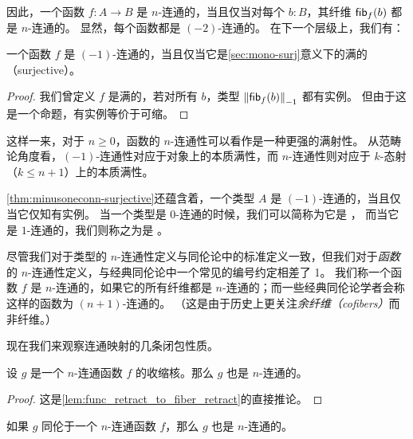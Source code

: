 
因此，一个函数 $f:A\to B$ 是 $n$-连通的，当且仅当对每个 $b:B$，其纤维 $\hfib{f}b$ 都是 $n$-连通的。
显然，每个函数都是 $(-2)$-连通的。
在下一个层级上，我们有：

\begin{lem}\label{thm:minusoneconn-surjective}
  一个函数 $f$ 是 $(-1)$-连通的，当且仅当它是\cref{sec:mono-surj}意义下的满的（surjective）。
\end{lem}

\begin{proof}
  我们曾定义 $f$ 是满的，若对所有 $b$，类型 $\trunc{-1}{\hfiber f b}$ 都有实例。
  但由于这是一个命题，有实例等价于可缩。
\end{proof}

这样一来，对于 $n\ge 0$，函数的 $n$-连通性可以看作是一种更强的满射性。
从范畴论角度看，$(-1)$-连通性对应于对象上的本质满性，而 $n$-连通性则对应于 $k$-态射（$k\le n+1$）上的本质满性。

\cref{thm:minusoneconn-surjective}还蕴含着，一个类型 $A$ 是 $(-1)$-连通的，当且仅当它仅知有实例。
当一个类型是 $0$-连通的时候，我们可以简称为它是 ，
%
%
而当它是 $1$-连通的，我们则称之为是 。
%
%

\begin{rmk}\label{rmk:connectedness-indexing}
  尽管我们对于类型的 $n$-连通性定义与同伦论中的标准定义一致，但我们对于\emph{函数}的 $n$-连通性定义，与经典同伦论中一个常见的编号约定相差了 1。
  我们称一个函数 $f$ 是 $n$-连通的，如果它的所有纤维都是 $n$-连通的；而一些经典同伦论学者会称这样的函数为 $(n+1)$-连通的。
  （这是由于历史上更关注\emph{余纤维（cofibers）}而非纤维。）
\end{rmk}

现在我们来观察连通映射的几条闭包性质。

\begin{lem}
%
设 $g$ 是一个 $n$-连通函数 $f$ 的收缩核。那么 $g$ 也是 $n$-连通的。
\end{lem}

\begin{proof}
这是\cref{lem:func_retract_to_fiber_retract}的直接推论。
\end{proof}

\begin{cor}
如果 $g$ 同伦于一个 $n$-连通函数 $f$，那么 $g$ 也是 $n$-连通的。
\end{cor}

